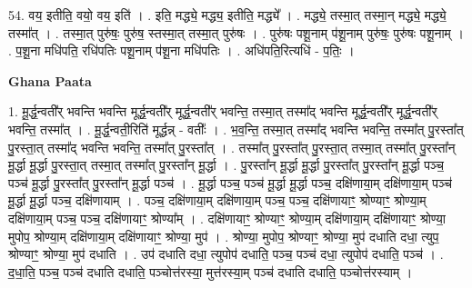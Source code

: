 \documentclass[17pt]{extarticle}
\begin{document}
54. वय॒ इतीति॒ वयो॒ वय॒ इति॑ । . इति॒ मद्ध्ये॒ मद्ध्य॒ इतीति॒ मद्ध्ये᳚ । . मद्ध्ये॒ तस्मा॒त् तस्मा॒न् मद्ध्ये॒ मद्ध्ये॒ तस्मा᳚त् । . तस्मा॒त् पुरु॑षः॒ पुरु॑ष॒ स्तस्मा॒त् तस्मा॒त् पुरु॑षः । . पुरु॑षः पशू॒नाम् प॑शू॒नाम् पुरु॑षः॒ पुरु॑षः पशू॒नाम् । . प॒शू॒ना मधि॑पति॒ रधि॑पतिः पशू॒नाम् प॑शू॒ना मधि॑पतिः । . अधि॑पति॒रित्यधि॑ - प॒तिः॒ । \newline

\textbf{Ghana Paata } \newline

1. मू॒र्द्ध॒न्वती᳚र् भवन्ति भवन्ति मूर्द्ध॒न्वती᳚र् मूर्द्ध॒न्वती᳚र् भवन्ति॒ तस्मा॒त् तस्मा᳚द् भवन्ति मूर्द्ध॒न्वती᳚र् मूर्द्ध॒न्वती᳚र् भवन्ति॒ तस्मा᳚त् । . मू॒र्द्ध॒न्वती॒रिति॑ मूर्द्धन्न् - वतीः᳚ । . भ॒व॒न्ति॒ तस्मा॒त् तस्मा᳚द् भवन्ति भवन्ति॒ तस्मा᳚त् पु॒रस्ता᳚त् पु॒रस्ता॒त् तस्मा᳚द् भवन्ति भवन्ति॒ तस्मा᳚त् पु॒रस्ता᳚त् । . तस्मा᳚त् पु॒रस्ता᳚त् पु॒रस्ता॒त् तस्मा॒त् तस्मा᳚त् पु॒रस्ता᳚न् मू॒र्द्धा मू॒र्द्धा पु॒रस्ता॒त् तस्मा॒त् तस्मा᳚त् पु॒रस्ता᳚न् मू॒र्द्धा । . पु॒रस्ता᳚न् मू॒र्द्धा मू॒र्द्धा पु॒रस्ता᳚त् पु॒रस्ता᳚न् मू॒र्द्धा पञ्च॒ पञ्च॑ मू॒र्द्धा पु॒रस्ता᳚त् पु॒रस्ता᳚न् मू॒र्द्धा पञ्च॑ । . मू॒र्द्धा पञ्च॒ पञ्च॑ मू॒र्द्धा मू॒र्द्धा पञ्च॒ दक्षि॑णाया॒म् दक्षि॑णाया॒म् पञ्च॑ मू॒र्द्धा मू॒र्द्धा पञ्च॒ दक्षि॑णायाम् । . पञ्च॒ दक्षि॑णाया॒म् दक्षि॑णाया॒म् पञ्च॒ पञ्च॒ दक्षि॑णायाꣳ॒॒ श्रोण्याꣳ॒॒ श्रोण्या॒म् दक्षि॑णाया॒म् पञ्च॒ पञ्च॒ दक्षि॑णायाꣳ॒॒ श्रोण्या᳚म् । . दक्षि॑णायाꣳ॒॒ श्रोण्याꣳ॒॒ श्रोण्या॒म् दक्षि॑णाया॒म् दक्षि॑णायाꣳ॒॒ श्रोण्या॒ मुपोप॒ श्रोण्या॒म् दक्षि॑णाया॒म् दक्षि॑णायाꣳ॒॒ श्रोण्या॒ मुप॑ । . श्रोण्या॒ मुपोप॒ श्रोण्याꣳ॒॒ श्रोण्या॒ मुप॑ दधाति दधा॒ त्युप॒ श्रोण्याꣳ॒॒ श्रोण्या॒ मुप॑ दधाति । . उप॑ दधाति दधा॒ त्युपोप॑ दधाति॒ पञ्च॒ पञ्च॑ दधा॒ त्युपोप॑ दधाति॒ पञ्च॑ । . द॒धा॒ति॒ पञ्च॒ पञ्च॑ दधाति दधाति॒ पञ्चोत्त॑रस्या॒ मुत्त॑रस्या॒म् पञ्च॑ दधाति दधाति॒ पञ्चोत्त॑रस्याम् । \newline
\end{document}

